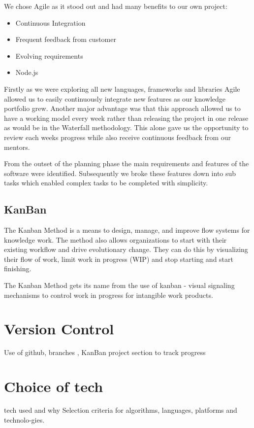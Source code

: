 We chose Agile as it stood out and had many benefits to our own project:

\begin{itemize}
\item Continuous Integration
\item Frequent feedback from customer 
\item Evolving requirements
\item Node.js
\end{itemize}

Firstly as we were exploring all new languages, frameworks and libraries Agile allowed us to easily continuously integrate new features as our knowledge portfolio grew. Another major advantage was that this approach allowed us to have a working model every week rather than releasing the project in one release as would be in the Waterfall methodology. This alone gave us the opportunity to review each weeks progress while also receive continuous feedback from our mentors.

From the outset of the planning phase the main requirements and features of the software were identified. Subsequently we broke these features down into sub tasks which enabled complex tasks to be completed with simplicity.   


\subsection{KanBan}
The Kanban Method is a means to design, manage, and improve flow systems for knowledge work. The method also allows organizations to start with their existing workflow and drive evolutionary change. They can do this by visualizing their flow of work, limit work in progress (WIP) and stop starting and start finishing.

The Kanban Method gets its name from the use of kanban - visual signaling mechanisms to control work in progress for intangible work products.

\section{Version Control}
Use of github, branches , KanBan project section to track progress

\section{Choice of tech }
tech used and why
 Selection criteria for algorithms, languages, platforms and technolo-gies.
 
